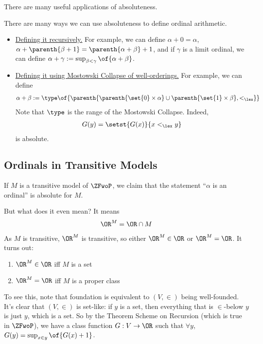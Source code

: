 There are many useful applications of absoluteness.

\begin{boxexample}
    There are many ways we can use absoluteness to define ordinal arithmetic.
    \begin{itemize}
        \item \underline{Defining it recursively.} For example, we can define $\alpha + 0 = \alpha$, $\alpha + \parenth{\beta + 1} = \parenth{\alpha + \beta} + 1$, and if $\gamma$ is a limit ordinal, we can define $\alpha + \gamma := \sup_{\beta < \gamma}\of{\alpha + \beta}$.

        \item \underline{Defining it using Mostowski Collapse of well-orderings.} For example, we can define
        \begin{align*}
            \alpha + \beta :=
            \type\of{\parenth{\parenth{\set{0} \times \alpha} \cup \parenth{\set{1} \times \beta}, <_{\lex}}}
        \end{align*}
        Note that $\type$ is the range of the Mostowski Collapse. Indeed,
        \begin{align*}
            G(y) = \setst{G(x)}{x <_{\lex} y}
        \end{align*}
        is absolute.
    \end{itemize}
\end{boxexample}

\subsection{Ordinals in Transitive Models} \label{Ch3:Subsec:Ordinals}


If $M$ is a transitive model of $\ZFwoP$, we claim that the statement ``$\alpha$ is an ordinal'' is absolute for $M$. %

But what does it even mean? It means
\begin{align*}
    \OR^M = \OR \cap M
\end{align*}
As $M$ is transitive, $\OR^M$ is transitive, so either $\OR^M \in \OR$ or $\OR^M = \OR$. It turns out:
\begin{enumerate}
    \item $\OR^M \in \OR$ iff $M$ is a set
    \item $\OR^M = \OR$ iff $M$ is a proper class
\end{enumerate}
To see this, note that foundation is equivalent to $(V, \in)$ being well-founded. It's clear that $(V, \in)$ is set-like: if $y$ is a set, then everything that is $\in$-below $y$ is just $y$, which is a set. So by the Theorem Scheme on Recursion (which is true in $\ZFwoP$), we have a class function $G : V \to \OR$ such that $\forall y$, $G(y) = \sup_{x \in y}\of{G(x) + 1}$.

